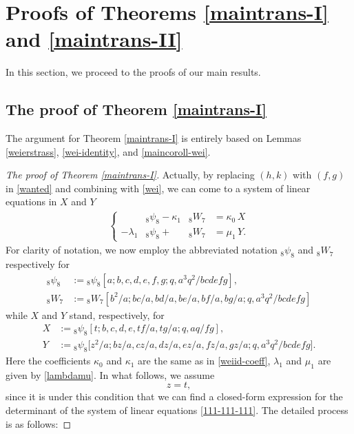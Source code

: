 \documentclass[xits,review,sort&compress]{elsarticle}
\numberwithin{equation}{section}
\begin{document}
\section{Proofs of Theorems \ref{maintrans-I} and \ref{maintrans-II} }
In this section, we proceed to the  proofs of  our main results.

\subsection{The  proof of Theorem \ref{maintrans-I}} The argument for Theorem \ref{maintrans-I} is entirely based on  Lemmas \ref{weierstrass}, \ref{wei-identity}, and \ref{maincoroll-wei}.

\begin{proof}[The proof of Theorem \ref{maintrans-I}] Actually,  by replacing  $(h,k)$ with $(f,g)$ in  \eqref{wanted} and combining with  \eqref{wei}, we  can come to  a system of linear equations in  $X$ and $Y$
\begin{eqnarray}\label{111-111-111}
\left\{\begin{array}{llll}
&{}_{8} \psi_{8}-\kappa_1&{}_{8}W_{7}&=\kappa_0\,X\\
-\lambda_1&{}_{8} \psi_{8}+&{}_{8}W_{7}&=\mu_1\,Y.
\end{array}
\right.
\end{eqnarray}
For clarity of notation, we now employ the abbreviated  notation ${}_{8} \psi_{8}$ and ${}_{8}W_{7}$  respectively for
 \begin{align}
{}_{8} \psi_{8}&:={}_{8} \psi_{8}\left[a ; b, c, d, e, f, g ; q, a^{3}q^{2}  / b c d e f g\right],\\
{}_{8}W_{7}&:={}_{8}W_{7}\left[b^{2} / a ; b c / a, b d / a, b e / a, b f / a, b g / a ; q, a^{3}q^{2}  / b c d e f g\right]
\nonumber
\end{align}
while $X$ and $Y$ stand,  respectively,  for
\begin{align}
X&:={}_{8} \psi_{8}[t ; b, c, d, e, t f / a, t g / a ; q, aq / f g],
\\
Y&:={}_{8}\psi_{8}\big[z^2/a;bz/a,cz/a,dz/a,
ez/a,fz/a,gz/a;q,a^3q^2/bcdefg\big].\nonumber
\end{align}
Here the coefficients $\kappa_0$ and $\kappa_1$ are the same as in  \eqref{weiid-coeff}, $\lambda_1$ and $\mu_1$ are given by \eqref{lambdamu}.
In what follows, we assume  $$z=t,$$ since it is  under this condition  that we can find a closed-form expression for the   determinant of the system of linear equations \eqref{111-111-111}. The detailed process is as follows:

\end{proof}
\end{document}

